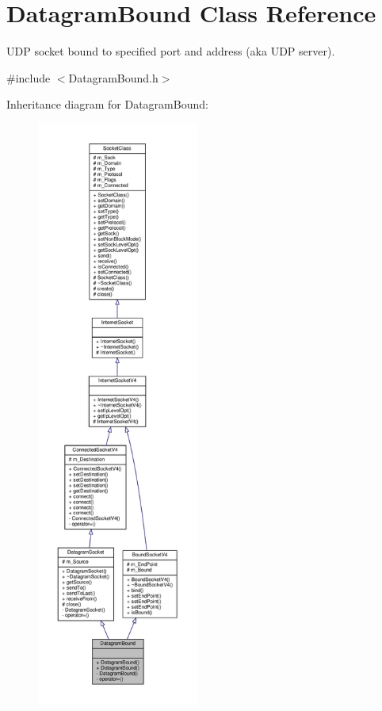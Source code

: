 \hypertarget{classDatagramBound}{}\section{Datagram\+Bound Class Reference}
\label{classDatagramBound}


U\+DP socket bound to specified port and address (aka U\+DP server).  




{\ttfamily \#include $<$Datagram\+Bound.\+h$>$}



Inheritance diagram for Datagram\+Bound\+:\nopagebreak
\begin{figure}[H]
\begin{center}
\leavevmode
\includegraphics[height=550pt]{classDatagramBound__inherit__graph}
\end{center}
\end{figure}
